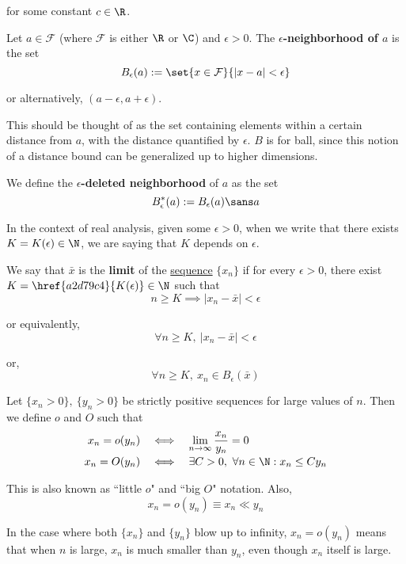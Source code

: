 for some constant $c\in\R$.

\label{ba35f12}

Let $a\in\mathcal F$ (where $\mathcal F$ is either $\R$ or $\C$) and
$\epsilon>0$. The \textbf{$\epsilon$-neighborhood of $a$} is the set
$$
  B_\epsilon(a):=\set{x\in\mathcal F}{|x-a|<\epsilon}
$$

or alternatively, $(a-\epsilon,a+\epsilon)$.

This should be thought of as the set containing elements within a certain
distance from $a$, with the distance quantified by $\epsilon$. $B$ is for ball,
since this notion of a distance bound can be generalized up to higher
dimensions.

We define the \textbf{$\epsilon$-deleted neighborhood} of $a$ as the set
$$
  B^*_\epsilon(a):=B_\epsilon(a)\sans a
$$

\label{a2d79c4}

In the context of real analysis, given some $\epsilon>0$, when we write that
there exists $K=K(\epsilon)\in\N$, we are saying that $K$ depends on
$\epsilon$.

\label{e565120}

We say that $\bar x$ is the \textbf{limit} of the \href{b5fa0e4}{sequence}
$\{x_n\}$ if for every $\epsilon>0$, there exist
$K=\href{a2d79c4}{K(\epsilon)}\in\N$ such that
$$
  n\geq K\implies|x_n-\bar x|<\epsilon
$$

or equivalently,
$$
  \forall n\geq K,\ |x_n-\bar x|<\epsilon
$$

or,
$$
  \forall n\geq K,\ x_n\in B_\epsilon(\bar x)
$$

\label{ab54b3a}

Let $\{x_n>0\},\ \{y_n>0\}$ be strictly positive sequences for large values of
$n$. Then we define $o$ and $O$ such that
$$
  \begin{array}{r c l}
    x_n=o(y_n) & \iff & \displaystyle\lim_{n\to\infty}\frac{x_n}{y_n}=0 \\[0.7em]
    x_n=O(y_n) & \iff & \exists C>0,\ \forall n\in\N:x_n\leq Cy_n
  \end{array}
$$

This is also known as ``little $o$" and ``big $O$" notation. Also,
$$
  x_n=o(y_n)\equiv x_n\ll y_n
$$

In the case where both $\{x_n\}$ and $\{y_n\}$ blow up to infinity,
$x_n=o(y_n)$ means that when $n$ is large, $x_n$ is much smaller than $y_n$,
even though $x_n$ itself is large.

